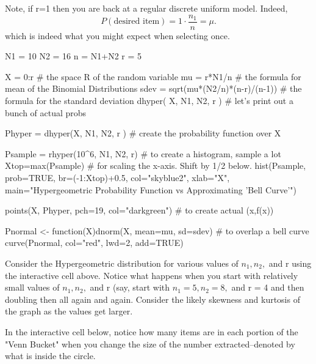 \documentclass[10pt,]{book}
\numberwithin{equation}{section}
\begin{document}
%
\par
\hypertarget{p-852}{}%
Note, if r=1 then you are back at a regular discrete uniform model. Indeed,%
\begin{equation*}
P(\text{desired item}) = 1 \cdot \frac{n_1}{n} = \mu .
\end{equation*}
which is indeed what you might expect when selecting once.%
\par
\hypertarget{p-853}{}%
\leavevmode%
\begin{sageinput}
N1 = 10
N2 = 16
n = N1+N2
r = 5

X = 0:r        # the space R of the random variable 
mu = r*N1/n      # the formula for mean of the Binomial Distributions
sdev = sqrt(mu*(N2/n)*(n-r)/(n-1))  # the formula for the standard deviation
dhyper( X, N1, N2, r )   # let's print out a bunch of actual probs

Phyper = dhyper(X, N1, N2, r )  # create the probability function over X

Psample = rhyper(10^6, N1, N2, r)  # to create a histogram, sample a lot
Xtop=max(Psample)          # for scaling the x-axis. Shift by 1/2 below.
hist(Psample, prob=TRUE, br=(-1:Xtop)+0.5, col="skyblue2", xlab="X", 
  main="Hypergeometric Probability Function vs Approximating 'Bell Curve'")

points(X, Phyper, pch=19, col="darkgreen")  # to create actual (x,f(x))

Pnormal <- function(X){dnorm(X, mean=mu, sd=sdev)}   # to overlap a bell curve
curve(Pnormal, col="red", lwd=2, add=TRUE)
\end{sageinput}
%
\par
\hypertarget{p-854}{}%
Consider the Hypergeometric distribution for various values of \(n_1, n_2,\) and r using the interactive cell above. Notice what happens when you start with relatively small values of \(n_1, n_2,\) and r (say, start with \(n_1 = 5, n_2 = 8,\) and r = 4 and then doubling then all again and again. Consider the likely skewness and kurtosis of the graph as the values get larger.%
\par
\hypertarget{p-855}{}%
In the interactive cell below, notice how many items are in each portion of the "Venn Bucket" when you change the size of the number extracted--denoted by what is inside the circle.%
\end{document}
